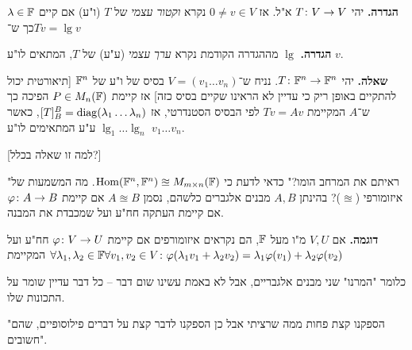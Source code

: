 \documentclass[]{../../../../tex/classes/styledArticle}
\begin{document}
	\textbf{הגדרה. }יהי $T \colon V \to V$ א"ל. אז $0 \neq v \in V$ נקרא \textit{וקטור עצמי} של $T$ (ו"ע) אם קיים $\lambda \in \mathbb{F}$ כך ש־$T v =\lg v$
	
	\textbf{הגדרה. }$\lg$ מההגדרה הקודמת נקרא \textit{ערך עצמי} (ע"ע) של $T$, המתאים לו"ע $v$. 
	
	\textbf{שאלה. }יהי $T \colon \mathbb{F}^n \to \mathbb{F}^n$. נניח ש־$V = (v_1 \dots v_n)$ בסיס של ו"ע של $\mathbb{F}^n$ [תיאורטית יכול להתקיים באופן ריק כי עדיין לא הראינו שקיים בסיס כזה] אז קיימת $P \in M_n(\mathbb{F})$ הפיכה כך ש־$A$ המקיימת $Tv = Av$ לפי הבסיס הסטנדרטי, אז $[T]^B_B = \operatorname{diag}(\lambda_1 \dots \lambda_n)$, כאשר $\lg_1 \dots \lg_n$ ע"ע המתאימים לו"ע $v_1 \dots v_n$. 
	
	[למה זו שאלה בכלל?]
	
	"ראיתם את המרחב הומו?"
	כדאי לדעת כי $\operatorname{Hom}(\mathbb{F}^n, \mathbb{F}^n) \approxeq M_{m \times n}(\mathbb{F})$. מה המשמעות של איזומורפי ($\approxeq$)? בהינתן $A, B$ מבנים אלגברים כלשהם, נסמן $A \approxeq B$ אם קיימת $\varphi \colon A \to B$ אם קיימת העתקה חח"ע ועל שמכבדת את המבנה. 
	
	\textbf{דוגמה. }אם $V, U$ מ"ו מעל $\mathbb{F}$, הם נקראים איזומורפים אם קיימת $\varphi \colon V \to U$ חח"ע ועל המקיימת $\forall \lambda_1, \lambda_2 \in \mathbb{F} \forall v_1, v_2 \in V \colon \varphi(\lambda_1v_1 + \lambda_2v_2) = \lambda_1\varphi(v_1) + \lambda_2\varphi(v_2)$
	
	כלומר "המרנו" שני מבנים אלגבריים, אבל לא באמת עשינו שום דבר – כל דבר עדיין שומר על התכונות שלו. 
	
	"הספקנו קצת פחות ממה שרציתי אבל כן הספקנו לדבר קצת על דברים פילוסופיים, שהם חשובים". 
	
	
\end{document}
